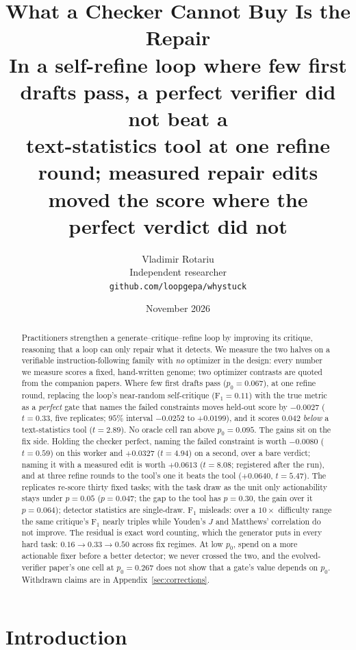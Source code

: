 \documentclass[11pt]{article}
\title{What a Checker Cannot Buy Is the Repair\\
\large In a self-refine loop where few first drafts pass, a perfect verifier did not beat a\\
text-statistics tool at one refine round; measured repair edits moved the score where the\\
perfect verdict did not}
\author{Vladimir Rotariu \\ Independent researcher \\
  \texttt{github.com/loopgepa/whystuck}}
\date{November 2026}
\begin{document}
\maketitle

\begin{abstract}
Practitioners strengthen a generate--critique--refine loop by improving its critique, reasoning
that a loop can only repair what it detects. We measure the two halves
on a verifiable instruction-following family with \emph{no} optimizer in the design: every number
we measure scores a fixed, hand-written genome; two optimizer contrasts are quoted from the
companion papers. Where few first drafts pass ($p_0 = 0.067$), at one refine round, replacing
the loop's near-random self-critique (F$_1 = 0.11$) with the true metric as a \emph{perfect} gate
that names the failed constraints moves held-out score by $-0.0027$ ($t = 0.33$, five
replicates; $95\%$ interval $-0.0252$ to $+0.0199$), and it scores $0.042$ \emph{below} a
text-statistics tool ($t = 2.89$). No oracle cell ran above $p_0 = 0.095$. The gains sit on the
fix side. Holding the checker perfect, naming the failed constraint is worth
$-0.0080$ ($t = 0.59$) on this worker and $+0.0327$ ($t = 4.94$) on a second, over a bare verdict;
naming it with a measured edit is worth $+0.0613$ ($t = 8.08$; registered after the run), and at
three refine rounds to the tool's one it beats the tool ($+0.0640$, $t = 5.47$).
The replicates re-score thirty fixed
tasks; with the task draw as the unit only actionability stays under $p = 0.05$ ($p = 0.047$; the
gap to the tool has $p = 0.30$, the gain over it $p = 0.064$); detector statistics are single-draw.
F$_1$ misleads: over a $10\times$ difficulty range the same critique's
F$_1$ nearly triples while Youden's $J$ and Matthews' correlation do not improve. The residual is
exact word counting, which the generator puts in every hard task: $0.16 \to 0.33 \to 0.50$
across fix regimes. At low $p_0$, spend on a more actionable fixer before a better detector; we
never crossed the two, and the evolved-verifier paper's one cell at $p_0 = 0.267$ does not show
that a gate's value depends on $p_0$. Withdrawn claims are in Appendix~\ref{sec:corrections}.
\end{abstract}



\section{Introduction}
\label{sec:intro}
\end{document}
